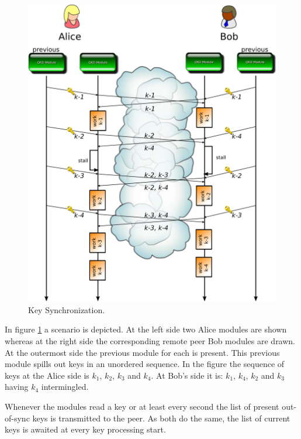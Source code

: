 \begin{figure}[h]
    \centering
    \includegraphics{./gfx/qkd-key-synchronization.png}
    \caption{Key Synchronization.}
    \label{fig:qkd-key-synchronization}
\end{figure}

\medskip

In figure \ref{fig:qkd-key-synchronization} a scenario is depicted. At the left side two Alice modules are shown whereas at the right side the corresponding remote peer Bob modules are drawn. At the outermost side the previous module for each is present. This previous module spills out keys in an unordered sequence. In the figure the sequence of keys at the Alice side is $k_1$, $k_2$, $k_3$ and $k_4$. At Bob's side it is: $k_1$, $k_4$, $k_2$ and $k_3$ having $k_4$ intermingled.

\medskip

Whenever the modules read a key or at least every second the list of present out-of-sync keys is transmitted to the peer. As both do the same, the list of current keys is awaited at every key processing start.

